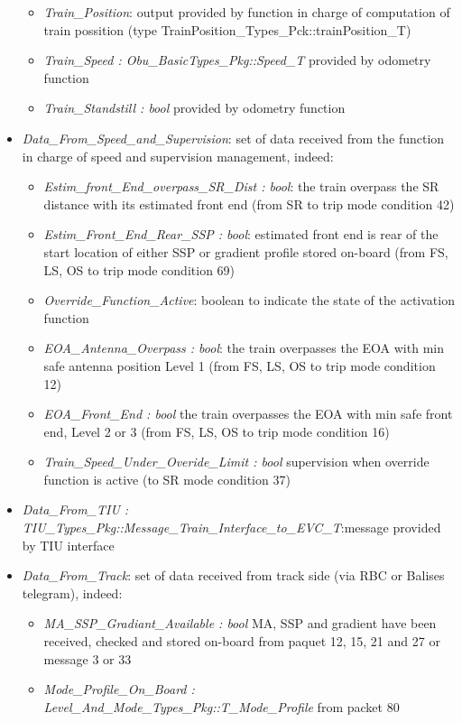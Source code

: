 \begin{itemize}
\begin{itemize}
\item \emph{Train\_Position}: output provided by function in charge of computation of train possition (type	TrainPosition\_Types\_Pck::trainPosition\_T)	\item \emph{Train\_Speed : Obu\_BasicTypes\_Pkg::Speed\_T} provided by odometry function
\item \emph{Train\_Standstill : bool} provided by odometry function
\end{itemize}
\item \emph{Data\_From\_Speed\_and\_Supervision}: set of data received from the function in charge of speed and supervision management, indeed:
\begin{itemize}
\item \emph{Estim\_front\_End\_overpass\_SR\_Dist : bool}: the train overpass the SR distance with its estimated front end (from SR to trip mode condition 42) 
\item \emph{Estim\_Front\_End\_Rear\_SSP : bool}: estimated front end is rear of the start location of either SSP or gradient profile stored on-board (from FS, LS, OS to trip mode condition 69)
\item \emph{Override\_Function\_Active}: boolean to indicate the state of the activation function 	  	
\item \emph{EOA\_Antenna\_Overpass : bool}: the train overpasses the  EOA  with min safe antenna position Level 1 (from FS, LS, OS to trip mode condition 12)
\item \emph{EOA\_Front\_End : bool} the train overpasses the  EOA  with min safe front end, Level 2 or 3 (from FS, LS, OS to trip mode condition 16)
\item \emph{Train\_Speed\_Under\_Overide\_Limit : bool} supervision when override function is active (to SR mode condition 37)
\end{itemize}
\item \emph{Data\_From\_TIU : TIU\_Types\_Pkg::Message\_Train\_Interface\_to\_EVC\_T}:message provided by TIU interface
\item \emph{Data\_From\_Track}: set of data received from track side (via RBC or Balises telegram), indeed:
\begin{itemize}
\item \emph{MA\_SSP\_Gradiant\_Available : bool} MA, SSP and gradient have been received, checked and stored on-board from paquet 12, 15, 21 and 27 or message 3 or 33
\item \emph{Mode\_Profile\_On\_Board : Level\_And\_Mode\_Types\_Pkg::T\_Mode\_Profile} from packet 80

\end{itemize}
\end{itemize}
